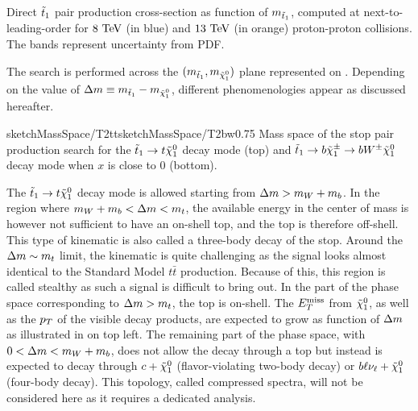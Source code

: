     {Direct $\tilde{t}_1$ pair production cross-section as function of $m_{\tilde{t}_1}$, computed at next-to-leading-order
    for $8~\text{TeV}$ (in blue) and $13~\text{TeV}$ (in orange) proton-proton collisions. The bands represent uncertainty from PDF.}

    The search is performed across the $(m_{\tilde{t}_1},m_{\tilde{\chi}_1^0})$ plane
    represented on . Depending on the value of
    $\Delta m \equiv m_{\tilde{t}_1} - m_{\tilde{\chi}_1^0}$, different phenomenologies
    appear as discussed hereafter.

                 {sketchMassSpace/T2tt}{sketchMassSpace/T2bw}{0.75}
                 {Mass space of the stop pair production search for the $\tilde{t}_1
                 \rightarrow t \tilde{\chi}_1^0$ decay mode (top) and $\tilde{t}_1
                 \rightarrow b \tilde{\chi}_1^\pm \rightarrow b W^{\pm} \tilde{\chi}_1^0 $ decay
                 mode when $x$ is close to 0 (bottom).}

    The $\tilde{t}_1 \rightarrow t \tilde{\chi}_1^0$ decay mode is allowed starting from $\Delta m
    > m_{W} + m_{b}$. In the region where $m_{W} + m_{b} < \Delta m < m_{t}$,
    the available energy in the center of mass is however not sufficient to have an
    on-shell top, and the top is therefore off-shell. This type of kinematic is also
    called a three-body decay of the stop. Around the $\Delta m \sim m_{t}$ limit,
    the kinematic is quite challenging as the signal looks almost identical to
    the Standard Model $t\bar{t}$ production. Because of this, this region is called
    stealthy as such a signal is difficult to bring out. In the part of the phase space
    corresponding to $\Delta m > m_{t}$, the top is on-shell. The $E_T^\text{miss}$ from $\tilde{\chi}_1^0$,
    as well as the $p_T$ of the visible decay products, are expected to grow as function of
    $\Delta m$ as illustrated in  on top left. The remaining
    part of the phase space, with $0 < \Delta m < m_{W} + m_{b}$, does not allow
    the decay through a top but instead is expected to decay through $c+\tilde{\chi}_1^0$
    (flavor-violating two-body decay) or $b\ell\nu_\ell+\tilde{\chi}_1^0$ (four-body decay).
    This topology, called compressed spectra, will not be considered here as it requires
    a dedicated analysis.

